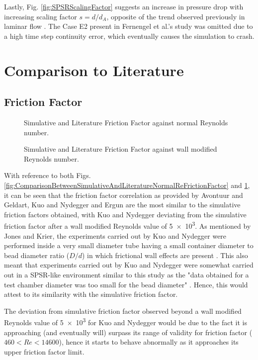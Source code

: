 Lastly, Fig. \ref{fig:SPSRScalingFactor} suggests an increase in pressure drop with increasing scaling factor $s = d/d_A$, opposite of the trend observed previously in laminar flow \cite{Fernengel2020}. The Case E2 present in Fernengel et al.'s study \cite{Fernengel2020} was omitted due to a high time step continuity error, which eventually causes the simulation to crash.
\section{Comparison to Literature}
\subsection{Friction Factor}
\begin{figure} [H]

\caption{Simulative and Literature Friction Factor against normal Reynolds number.}%
\label{fig:ComparisonBetweenSimulativeAndLiteratureNormalReFrictionFactor}%


\caption{Simulative and Literature Friction Factor against wall modified Reynolds number.}%
\label{fig:ComparisonBetweenSimulativeAndLiteratureWallModReFrictionFactor}%
\end{figure}
With reference to both Figs. \ref{fig:ComparisonBetweenSimulativeAndLiteratureNormalReFrictionFactor} and \ref{fig:ComparisonBetweenSimulativeAndLiteratureWallModReFrictionFactor}, it can be seen that the friction factor correlation as provided by Avontuur and Geldart, Kuo and Nydegger and Ergun are the most similar to the simulative friction factors obtained, with Kuo and Nydegger deviating from the simulative friction factor after a wall modified Reynolds value of \num{5e3}. As mentioned by Jones and Krier, the experiments carried out by Kuo and Nydegger were performed inside a very small diameter tube having a small container diameter to bead diameter ratio ($D/d$) in which frictional wall effects are present \cite{Jones1983}. This also meant that experiments carried out by Kuo and Nydegger were somewhat carried out in a SPSR-like environment similar to this study as the "data obtained for a test chamber diameter was too small for the bead diameter" \cite{Jones1983}. Hence, this would attest to its similarity with the simulative friction factor.

The deviation from simulative friction factor observed beyond a wall modified Reynolds value of \num{5e3} for Kuo and Nydegger would be due to the fact it is approaching (and eventually will) surpass its range of validity for friction factor ($460 < Re <14600$), hence it starts to behave abnormally as it approaches its upper friction factor limit.

